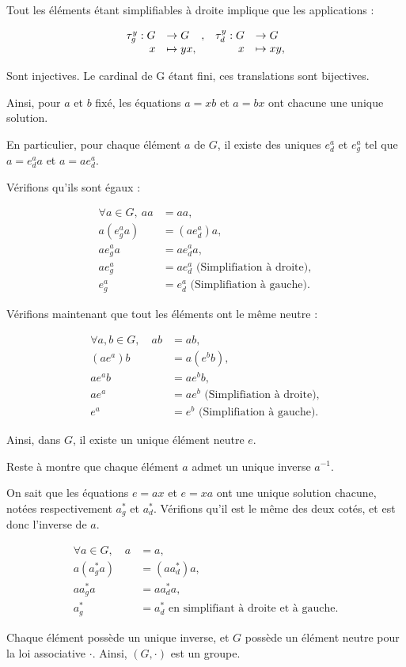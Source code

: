 Tout les éléments étant simplifiables à droite implique que les applications :

\[
\begin{array}[t]{rl}
\tau_g^y : G &\rightarrow G \\
x &\mapsto yx,
\end{array},\ 
\begin{array}[t]{rl}
\tau_d^y : G &\rightarrow G \\
x &\mapsto xy,
\end{array}
\]

Sont injectives. Le cardinal de G étant fini, ces translations sont bijectives.

Ainsi, pour $a$ et $b$ fixé, les équations $a=xb$ et $a=bx$ ont chacune une unique solution.

En particulier, pour chaque élément $a$ de $G$, il existe des uniques $e_d^a$ et $e_g^a$ tel que $a=e_d^a a$ et $a=ae_d^a$.

Vérifions qu'ils sont égaux :

\begin{align*}
    \forall a \in G,\ aa&=aa, \\
    a(e_g^aa) &= (ae_d^a)a, \\
    ae_g^aa &= ae_d^aa, \\
    ae_g^a &= ae_d^a \text{ (Simplifiation à droite)}, \\
    e_g^a &= e_d^a \text{ (Simplifiation à gauche)}.
\end{align*}

Vérifions maintenant que tout les éléments ont le même neutre : 

\begin{align*}
    \forall a, b \in G,\quad ab&=ab,\\
    (ae^a)b &= a(e^bb), \\
    ae^ab &= ae^bb, \\
    ae^a &= ae^b \text{ (Simplifiation à droite)}, \\
    e^a &= e^b \text{ (Simplifiation à gauche)}.
\end{align*}

Ainsi, dans $G$, il existe un unique élément neutre $e$.

Reste à montre que chaque élément $a$ admet un unique inverse $a^{-1}$.

On sait que les équations $e = ax$ et $e = xa$ ont une unique solution chacune, notées respectivement $a^*_g$ et $a^*_d$. Vérifions qu'il est le même des deux cotés, et est donc l'inverse de $a$.

\begin{align*}
    \forall a \in G,\quad a &= a, \\
    a (a^*_g a) &= (a a^*_d) a, \\
    a a^*_g a &= a a^*_d a, \\
    a^*_g &= a^*_d \text{ en simplifiant à droite et à gauche.}
\end{align*}

Chaque élément possède un unique inverse, et $G$ possède un élément neutre pour la loi associative $\cdot$. 
Ainsi, $(G,\cdot)$ est un groupe.